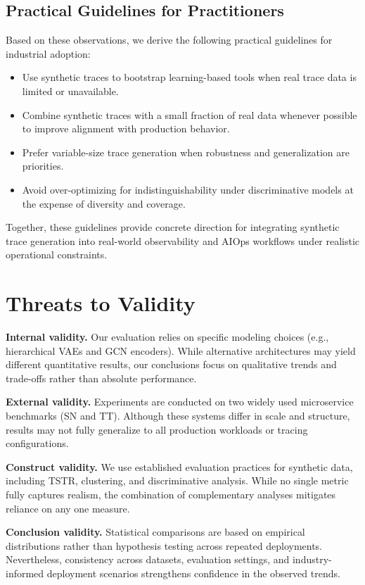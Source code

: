 \documentclass[sigconf,review]{acmart}
\begin{document}
\subsection{Practical Guidelines for Practitioners}

Based on these observations, we derive the following practical guidelines for industrial adoption:

\begin{itemize}
    \item Use synthetic traces to bootstrap learning-based tools when real trace data is limited or unavailable.
    \item Combine synthetic traces with a small fraction of real data whenever possible to improve alignment with production behavior.
    \item Prefer variable-size trace generation when robustness and generalization are priorities.
    \item Avoid over-optimizing for indistinguishability under discriminative models at the expense of diversity and coverage.
\end{itemize}

Together, these guidelines provide concrete direction for integrating synthetic trace generation into real-world observability and AIOps workflows under realistic operational constraints.

\section{Threats to Validity}

\textbf{Internal validity.}
Our evaluation relies on specific modeling choices (e.g., hierarchical VAEs and GCN encoders). While alternative architectures may yield different quantitative results, our conclusions focus on qualitative trends and trade-offs rather than absolute performance.

\textbf{External validity.}
Experiments are conducted on two widely used microservice benchmarks (SN and TT). Although these systems differ in scale and structure, results may not fully generalize to all production workloads or tracing configurations.

\textbf{Construct validity.}
We use established evaluation practices for synthetic data, including TSTR, clustering, and discriminative analysis. While no single metric fully captures realism, the combination of complementary analyses mitigates reliance on any one measure.

\textbf{Conclusion validity.}
Statistical comparisons are based on empirical distributions rather than hypothesis testing across repeated deployments. Nevertheless, consistency across datasets, evaluation settings, and industry-informed deployment scenarios strengthens confidence in the observed trends.
\end{document}
